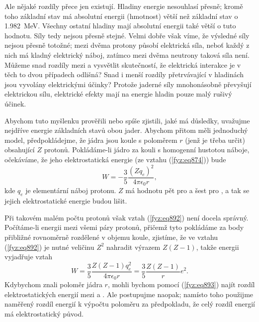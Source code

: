     Ale nějaké rozdíly přece jen existují. Hladiny energie nesouhlasí přesně; kromě toho základní
    stav  má absolutní energii (hmotnost) větší než základní stav  o
    \SI{1.982}{\mega\electronvolt}. Všechny ostatní hladiny mají absolutní energii také větší o tuto
    hodnotu. Síly tedy nejsou přesně stejné. Velmi dobře však víme, že výsledné síly nejsou přesně
    totožné; mezi dvěma protony působí elektrická síla, neboť každý z nich má kladný elektrický
    náboj, zatímco mezi dvěma neutrony taková síla není. Můžeme snad rozdíly mezi  a
     vysvětlit skutečností, že elektrická interakce je v těch to dvou případech odlišná?
    Snad i menší rozdíly přetrvávající v hladinách jsou vyvolány elektrickými účinky? Protože
    jaderné síly mnohonásobně převyšují elektrickou sílu, elektrické efekty mají na energie hladin
    pouze malý rušivý účinek.

    Abychom tuto myšlenku prověřili nebo spíše zjistili, jaké má důsledky, uvažujme nejdříve energie
    základních stavů obou jader. Abychom přitom měli jednoduchý model, předpokládejme, že jádra jsou
    koule s poloměrem \(r\) (jenž je třeba určit) obsahující \(Z\) protonů. Pokládáme-li jádro za
    kouli s homogenní hustotou náboje, očekáváme, že jeho elektrostatická energie (ze vztahu
    (\ref{fyz:eq874})) bude
    \begin{equation}\label{fyz:eq892}
      W=−\dfrac{3}{5}\dfrac{(Zq_e)^2}{4πϵ_0r},
    \end{equation}
    kde \(q_e\) je elementární náboj protonu. \(Z\) má hodnotu pět pro  a šest pro
    , a tak se jejich elektrostatické energie budou lišit.
    
    Při takovém malém počtu protonů však vztah (\ref{fyz:eq892}) není docela správný. Počítáme-li
    energii mezi všemi páry protonů, přičemž tyto pokládáme za body přibližné rovnoměrně rozdělené v
    objemu koule, zjistíme, že ve vztahu (\ref{fyz:eq892}) je nutné veličinu \(Z^2\) nahradit
    výrazem \(Z(Z - 1)\), takže energii vyjadřuje vztah
    \begin{equation}\label{fyz:eq893}
      W=\dfrac{3}{5}\dfrac{Z(Z−1)q^2_e}{4πϵ_0r}=\dfrac{3}{5}\dfrac{Z(Z−1)}{r}e^2.
    \end{equation}
    Kdybychom znali poloměr jádra \(r\), mohli bychom pomocí (\ref{fyz:eq893}) najít rozdíl
    elektrostatických energií mezi  a . Ale postupujme naopak; namísto toho
    použijme naměřený rozdíl energií k výpočtu poloměru za předpokladu, že celý rozdíl energií má
    elektrostatický původ.

